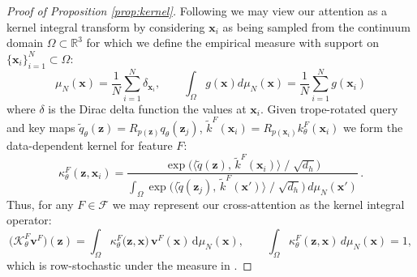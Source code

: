 \begin{proof}[Proof of Proposition \ref{prop:kernel}]
Following \cite{gao_learning_2024} we may view our attention as a kernel integral transform by considering \(\mathbf{x}_i\) as being sampled from the continuum domain \(\Omega \subset \mathbb{R}^3\) for which we define the empirical measure with support on \(\{\mathbf{x}_i\}_{i=1}^N \subset \Omega\):
\begin{equation}
    {\mu_N} (\mathbf{x}) = \frac{1}{N} \sum_{i=1}^N \delta_{\mathbf{x}_i}, \qquad \int_\Omega g(\mathbf{x})d {\mu_N } (\mathbf x) =\frac{1}{N} \sum_{i=1}^N g(\mathbf{x}_i)
    \label{eq:measure}
\end{equation}
where \(\delta\) is the Dirac delta function  the values at \(\mathbf{x}_i\).
Given \gls{trope}-rotated query and key maps \(\tilde{q}_\theta(\mathbf{z})=R_{p(\mathbf{z})}q_\theta(\mathbf{z}_j)\), \(\tilde{k}^F(\mathbf{x}_i)=R_{p(\mathbf{x}_i)}k_\theta^F(\mathbf{x}_i)\) we form the data-dependent kernel for feature \(F\):
\begin{equation}
    \kappa_{\theta}^F(\mathbf{z}, \mathbf{x}_i)
    = 
    \frac{
      \exp\bigl(\langle \tilde q(\mathbf{z}),\,\tilde k^F(\mathbf{x}_i)\rangle \;/\;\sqrt{d_{h}}\bigr)
    }{
      \displaystyle
      \int_{\Omega}
        \exp\bigl(\langle \tilde q(\mathbf{z}_{j}),\,\tilde k^F(\mathbf{x}')\rangle \;/\;\sqrt{d_{h}}\bigr)
        \,d\mu_{N}(\mathbf{x}')
    }\,.
\end{equation}
Thus, for any \(F \in \mathcal{F}\) we may represent our cross-attention as the kernel integral operator:
\begin{equation}
    \bigl(\mathcal{K}_\theta^F \mathbf{v}^F\bigr)(\mathbf{z}) = \int_{\Omega} \kappa_\theta^F\bigl(\mathbf{z}, \mathbf{x}\bigr)\,\mathbf{v}^F(\mathbf{x})\,\mathrm{d}\mu_N(\mathbf{x}),
    \qquad
    \int_\Omega\kappa_\theta^F(\mathbf{z},\mathbf{x})\, d \mu_N(\mathbf{x})=1,
\end{equation}
which is row-stochastic under the measure in .     
\end{proof}